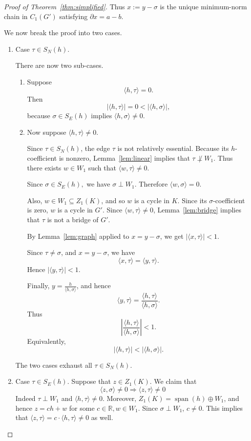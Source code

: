 \documentclass[10pt,a4paper]{amsart}
\newcommand {\la}   {{\langle}}
\newcommand {\ra}   {{\rangle}}
\begin{document}
\begin{proof}[Proof of Theorem~\ref{thm:simplified}]
Thus
$
x:=y-\sigma
$
is the unique minimum-norm chain in \(C_1(G')\) satisfying
$
\partial x=a-b
$.

We now break the proof into two cases.
\begin{enumerate}
\item Case $\tau\in S_N(h)$.

There are now two sub-cases.
\begin{enumerate}
\item
Suppose
\[
\langle h,\tau\rangle=0.
\]
Then
\[
|\langle h,\tau\rangle|
=
0
<
|\langle h,\sigma\rangle|,
\]
because \(\sigma\in S_E(h)\) implies
$
\langle h,\sigma\rangle\neq 0
$.

\item
Now suppose 
$
\langle h,\tau\rangle\neq 0.
$

Since
$
\tau\in S_N(h)
$,
the edge \(\tau\) is not relatively essential. Because its \(h\)-coefficient is
nonzero, 
Lemma~\ref{lem:linear}
implies that
$
\tau\not\perp W_1
$.
Thus there exists
$
w\in W_1
$
such that
$
\langle w,\tau\rangle\neq 0
$.

Since
$
\sigma\in S_E(h),
$
we have
$
\sigma\perp W_1.
$
Therefore
$
\langle w,\sigma\rangle=0.
$

Also,
$
w\in W_1\subseteq Z_1(K)
$,
and 
so \(w\) is a cycle in \(K\). Since its \(\sigma\)-coefficient is zero, \(w\)
is a cycle in \(G'\). Since
$
\langle w,\tau\rangle\neq 0
$,
Lemma~\ref{lem:bridge}
implies that \(\tau\) is not a bridge of \(G'\).

By 
Lemma~\ref{lem:graph}
applied to
$
x=y-\sigma
$,
we get
$
|\langle x,\tau\rangle|<1
$.

Since \(\tau\neq\sigma\), and \(x=y-\sigma\), we have
\[
\langle x,\tau\rangle
=
\langle y,\tau\rangle.
\]
Hence
$
|\langle y,\tau\rangle|<1
$.

Finally,
$
y=\frac{h}{\langle h,\sigma\rangle}
$, and
hence
\[
\langle y,\tau\rangle
=
\frac{\langle h,\tau\rangle}{\langle h,\sigma\rangle}.
\]
Thus
\[
\left|
\frac{\langle h,\tau\rangle}
     {\langle h,\sigma\rangle}
\right|
<1.
\]
Equivalently,
\[
|\langle h,\tau\rangle|
<
|\langle h,\sigma\rangle|.
\]
\end{enumerate}
The two cases exhaust all
$
\tau\in S_N(h)
$.

\item Case $\tau \in S_E(h)$. 
Suppose that $z \in Z_1(K)$. We claim that 
\begin{equation}
\label{eqn:proof:thm:simplified:0}
  \la z, \sigma\ra \neq 0  \Rightarrow \la z, \tau\ra \neq 0
\end{equation}
Indeed $\tau \perp W_1$ and $\la h, \tau \ra \neq 0$. Moreover,  
$Z_1(K) = \operatorname{span}(h) \oplus W_1$, and hence
$z = c h + w$ for some $c \in \mathbb{R}, w \in W_1$. Since $\sigma \perp W_1$,
$c \neq 0$. This implies that 
$\la z , \tau\ra = c \cdot \la h,\tau\ra \neq 0$ as well. 


\end{enumerate}
\end{proof}
\end{document}

